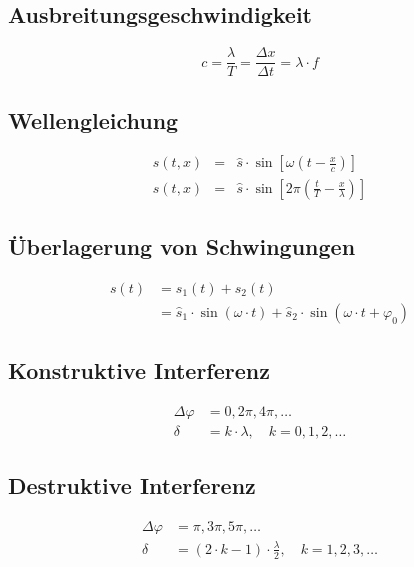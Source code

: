 
\subsection{Ausbreitungsgeschwindigkeit}
\begin{equation}\label{eq:wellen:ausbreitungsgeschwindigkeit}
c = \frac{\lambda}{T} =
\frac{\Delta x}{\Delta t} = \lambda \cdot f
\end{equation}

\subsection{Wellengleichung}
\begin{eqnarray}\label{eq:wellen:gleichung}
s(t,x) &=& \hat{s} \cdot \sin \left[ \omega \left( t - \frac{x}{c} \right)
\right]\\
s(t,x) &=& \hat{s} \cdot \sin \left[ 2\pi \left( \frac{t}{T} - \frac{x}{\lambda}
\right) \right]
\end{eqnarray}

\subsection{Überlagerung von Schwingungen}
\begin{equation}
\begin{split}
\label{eq:schwingung:ueberlagerung}
s(t) &= s_1(t) + s_2(t) \\
&= \hat{s}_1 \cdot \sin(\omega \cdot t) + \hat{s}_2 \cdot
\sin(\omega \cdot t + \varphi_0)
\end{split}
\end{equation}

\subsection{Konstruktive Interferenz}
\begin{equation}
\begin{split}
\label{eq:konstruktive:interferenz}
\Delta \varphi &= 0, 2\pi, 4\pi,\dots\\
 \delta &= k \cdot \lambda, \quad k = 0, 1, 2, \ldots
\end{split}
\end{equation}

\subsection{Destruktive Interferenz}
\begin{equation}
\begin{split}
\label{eq:destruktive:interferenz}
\Delta \varphi &= \pi, 3\pi, 5\pi,\dots \\
 \delta &= (2\cdot k - 1) \cdot \frac{\lambda}{2}, \quad k = 1, 2, 3, \ldots
\end{split}
\end{equation}

